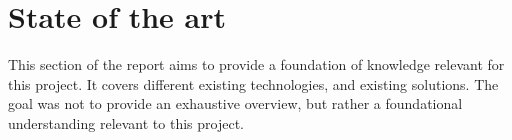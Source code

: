 \section{State of the art} \label{sec:state-of-art}
This section of the report aims to provide a foundation of knowledge relevant for this project. It covers different existing technologies, and existing solutions. The goal was not to provide an exhaustive overview, but rather a foundational understanding relevant to this project.









